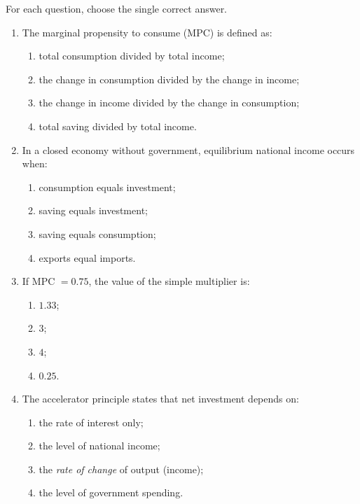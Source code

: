 \documentclass[11pt]{article}
\begin{document}
\begin{exercice}
For each question, choose the single correct answer.
\begin{enumerate}
\item The marginal propensity to consume (MPC) is defined as:
\begin{enumerate}
\item total consumption divided by total income;
\item the change in consumption divided by the change in income;
\item the change in income divided by the change in consumption;
\item total saving divided by total income.
\end{enumerate}
\item In a closed economy without government, equilibrium national income occurs when:
\begin{enumerate}
\item consumption equals investment;
\item saving equals investment;
\item saving equals consumption;
\item exports equal imports.
\end{enumerate}
\item If MPC $= 0.75$, the value of the simple multiplier is:
\begin{enumerate}
\item $1.33$;
\item $3$;
\item $4$;
\item $0.25$.
\end{enumerate}
\item The accelerator principle states that net investment depends on:
\begin{enumerate}
\item the rate of interest only;
\item the level of national income;
\item the \emph{rate of change} of output (income);
\item the level of government spending.
\end{enumerate}
\end{enumerate}
\end{exercice}
\end{document}
